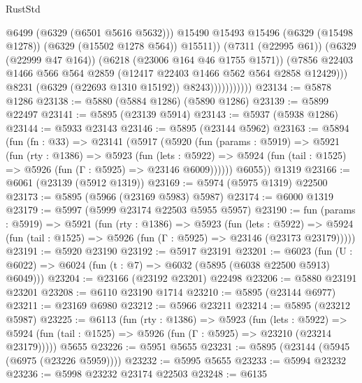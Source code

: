 \begin{lexlean}{RustStd}
\begin{coremodule}
{{                                  @6499
                                  (@6329 (@6501 @5616 @5632)))
                                @15490
                                @15493
                                @15496
                                (@6329 (@15498 @1278))
                                (@6329 (@15502 @1278 @564))
                                @15511))
                            (@7311 (@22995 @61))
                            (@6329 (@22999 @47 @164))
                            (@6218 (@23006 @164 @46 @1755 @1571))
                            (@7856
                              @22403
                              @1466
                              @566
                              @564
                              @2859
                              (@12417 @22403 @1466 @562 @564 @2858 @12429)))
                          @8231
                          (@6329 (@22693 @1310 @15192))
                          @8243)))))))))))
@23134 := @5878 @1286
@23138 := @5880 (@5884 @1286) (@5890 @1286)
@23139 := @5899 @22497
@23141 := @5895 (@23139 @5914)
@23143 := @5937 (@5938 @1286)
@23144 := @5933 @23143
@23146 := @5895 (@23144 @5962)
@23163 := @5894
    (fun (fn : @33) =>
    @23141
      (@5917
        (@5920
          (fun (params : @5919) =>
          @5921
            (fun (rty : @1386) =>
            @5923
              (fun (lets : @5922) =>
              @5924 (fun (tail : @1525) => @5926 (fun (Γ : @5925) => @23146 @6009))))))
        @6055))
    @1319
@23166 := @6061 (@23139 (@5912 @1319))
@23169 := @5974 (@5975 @1319) @22500
@23173 := @5895 (@5966 (@23169 @5983) @5987)
@23174 := @6000 @1319
@23179 := @5997 (@5999 @23174 @22503 @5955 @5957)
@23190 := fun (params : @5919) =>
  @5921
    (fun (rty : @1386) =>
    @5923
      (fun (lets : @5922) =>
      @5924 (fun (tail : @1525) => @5926 (fun (Γ : @5925) => @23146 (@23173 @23179)))))
@23191 := @5920 @23190
@23192 := @5917 @23191
@23201 := @6023
    (fun (U : @6022) => @6024 (fun (t : @7) => @6032 (@5895 (@6038 @22500 @5913) @6049)))
@23204 := @23166 (@23192 @23201) @22498
@23206 := @5880 @23191 @23201
@23208 := @6110 @23190 @1714
@23210 := @5895 (@23144 @6977)
@23211 := @23169 @6980
@23212 := @5966 @23211
@23214 := @5895 (@23212 @5987)
@23225 := @6113
    (fun (rty : @1386) =>
    @5923
      (fun (lets : @5922) =>
      @5924 (fun (tail : @1525) => @5926 (fun (Γ : @5925) => @23210 (@23214 @23179)))))
    @5655
@23226 := @5951 @5655
@23231 := @5895 (@23144 (@5945 (@6975 (@23226 @5959))))
@23232 := @5995 @5655
@23233 := @5994 @23232
@23236 := @5998 @23232 @23174 @22503
@23248 := @6135
}}
\end{coremodule}
\end{lexlean}
